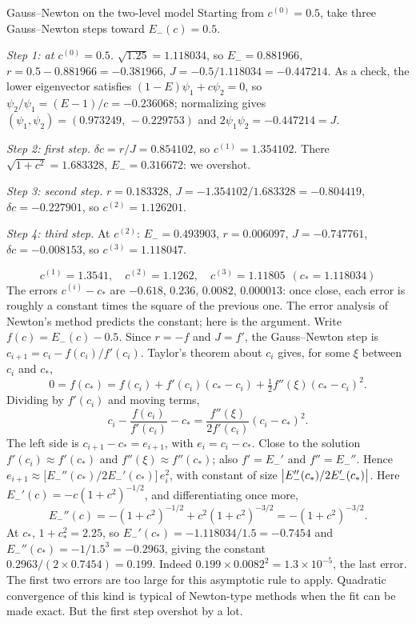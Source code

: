 \begin{sample}{Gauss--Newton on the two-level model}
Starting from $c^{(0)}=0.5$, take three Gauss--Newton steps toward $E_-(c)=0.5$.

\emph{Step 1: at $c^{(0)}=0.5$.} $\sqrt{1.25}=1.118034$, so $E_-=0.881966$, $r=0.5-0.881966=-0.381966$, $J=-0.5/1.118034=-0.447214$. As a check, the lower eigenvector satisfies $(1-E)\psi_1+c\psi_2=0$, so $\psi_2/\psi_1=(E-1)/c=-0.236068$; normalizing gives $(\psi_1,\psi_2)=(0.973249,\,-0.229753)$ and $2\psi_1\psi_2=-0.447214=J$.

\emph{Step 2: first step.} $\delta c=r/J=0.854102$, so $c^{(1)}=1.354102$. There $\sqrt{1+c^2}=1.683328$, $E_-=0.316672$: we overshot.

\emph{Step 3: second step.} $r=0.183328$, $J=-1.354102/1.683328=-0.804419$, $\delta c=-0.227901$, so $c^{(2)}=1.126201$.

\emph{Step 4: third step.} At $c^{(2)}$: $E_-=0.493903$, $r=0.006097$, $J=-0.747761$, $\delta c=-0.008153$, so $c^{(3)}=1.118047$.

\[
\boxed{c^{(1)}=1.3541,\quad c^{(2)}=1.1262,\quad c^{(3)}=1.11805\ \ (c_*=1.118034)}
\]
The errors $c^{(i)}-c_*$ are $-0.618$, $0.236$, $0.0082$, $0.000013$: once close, each error is roughly a constant times the square of the previous one. The error analysis of Newton's method predicts the constant; here is the argument. Write $f(c)=E_-(c)-0.5$. Since $r=-f$ and $J=f'$, the Gauss--Newton step is $c_{i+1}=c_i-f(c_i)/f'(c_i)$. Taylor's theorem about $c_i$ gives, for some $\xi$ between $c_i$ and $c_*$,
\[
0=f(c_*)=f(c_i)+f'(c_i)(c_*-c_i)+\tfrac12f''(\xi)(c_*-c_i)^2 .
\]
Dividing by $f'(c_i)$ and moving terms,
\[
c_i-\frac{f(c_i)}{f'(c_i)}-c_*=\frac{f''(\xi)}{2f'(c_i)}(c_i-c_*)^2 .
\]
The left side is $c_{i+1}-c_*=e_{i+1}$, with $e_i=c_i-c_*$. Close to the solution $f'(c_i)\approx f'(c_*)$ and $f''(\xi)\approx f''(c_*)$; also $f'=E_-'$ and $f''=E_-''$. Hence $e_{i+1}\approx\bigl[E_-''(c_*)/2E_-'(c_*)\bigr]\,e_i^2$, with constant of size $\left\lvert E_-''(c_*)/2E_-'(c_*)\right\rvert$. Here $E_-'(c)=-c(1+c^2)^{-1/2}$, and differentiating once more,
\[
E_-''(c)=-(1+c^2)^{-1/2}+c^2(1+c^2)^{-3/2}=-(1+c^2)^{-3/2}.
\]
At $c_*$, $1+c_*^2=2.25$, so $E_-'(c_*)=-1.118034/1.5=-0.7454$ and $E_-''(c_*)=-1/1.5^3=-0.2963$, giving the constant $0.2963/(2\times0.7454)=0.199$. Indeed $0.199\times0.0082^2=1.3\times10^{-5}$, the last error. The first two errors are too large for this asymptotic rule to apply. Quadratic convergence of this kind is typical of Newton-type methods when the fit can be made exact. But the first step overshot by a lot.
\end{sample}

